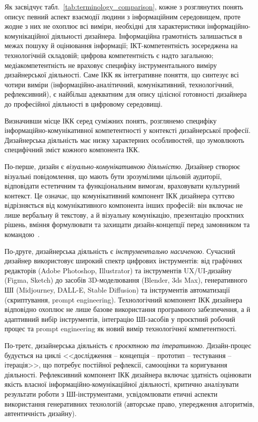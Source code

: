 Як засвідчує табл.~\ref{tab:terminology_comparison}, кожне з розглянутих понять описує певний аспект взаємодії людини з інформаційним середовищем, проте жодне з них не охоплює всі виміри, необхідні для характеристики інформаційно-комунікаційної діяльності дизайнера. Інформаційна грамотність залишається в межах пошуку й оцінювання інформації; ІКТ-компетентність зосереджена на технологічній складовій; цифрова компетентність є надто загальною; медіакомпетентність не враховує специфіку інструментального виміру дизайнерської діяльності. Саме ІКК як інтегративне поняття, що синтезує всі чотири виміри (інформаційно-аналітичний, комунікативний, технологічний, рефлексивний), є найбільш адекватним для опису цілісної готовності дизайнера до професійної діяльності в цифровому середовищі.


Визначивши місце ІКК серед суміжних понять, розглянемо специфіку інформаційно-комунікативної компетентності у контексті дизайнерської професії. Дизайнерська діяльність має низку характерних особливостей, що зумовлюють специфічний зміст кожного компонента ІКК.

По-перше, дизайн є \textit{візуально-комунікативною діяльністю}. Дизайнер створює візуальні повідомлення, що мають бути зрозумілими цільовій аудиторії, відповідати естетичним та функціональним вимогам, враховувати культурний контекст. Це означає, що комунікативний компонент ІКК дизайнера суттєво відрізняється від комунікативного компонента інших професій: він включає не лише вербальну й текстову, а й візуальну комунікацію, презентацію проєктних рішень, вміння формулювати та захищати дизайн-концепції перед замовником та командою~\cite{Musiienko2025DesignEducation}.

По-друге, дизайнерська діяльність є \textit{інструментально насиченою}. Сучасний дизайнер використовує широкий спектр цифрових інструментів: від графічних редакторів (Adobe Photoshop, Illustrator) та інструментів UX/UI-дизайну (Figma, Sketch) до засобів 3D-моделювання (Blender, 3ds Max), генеративного ШІ (Midjourney, DALL-E, Stable Diffusion) та інструментів автоматизації (скриптування, prompt engineering). Технологічний компонент ІКК дизайнера відповідно охоплює не лише базове використання програмного забезпечення, а й адаптивний вибір інструментів, інтеграцію ШІ-засобів у проєктний робочий процес та prompt engineering як новий вимір технологічної компетентності.

По-третє, дизайнерська діяльність є \textit{проєктною та ітеративною}. Дизайн-процес будується на циклі <<дослідження -- концепція -- прототип -- тестування -- ітерація>>, що потребує постійної рефлексії, самооцінки та коригування діяльності. Рефлексивний компонент ІКК дизайнера включає здатність оцінювати якість власної інформаційно-комунікаційної діяльності, критично аналізувати результати роботи з ШІ-інструментами, усвідомлювати етичні аспекти використання генеративних технологій (авторське право, упередження алгоритмів, автентичність дизайну).


